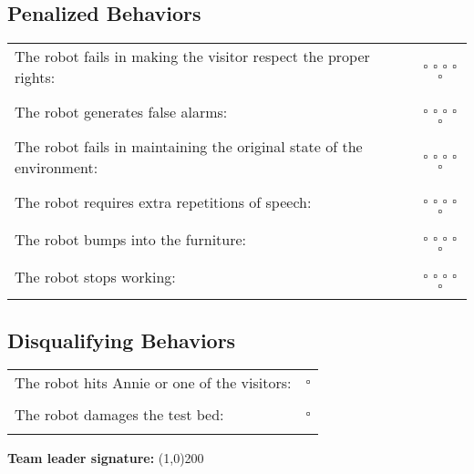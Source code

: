 \subsection*{Penalized Behaviors}
\begin{tabular}{ l c}
The robot fails in making the visitor respect the proper rights: & $\square$ $\square$ $\square$ $\square$ $\square$ \\ \\
The robot generates false alarms: & $\square$ $\square$ $\square$ $\square$ $\square$ \\ \\
The robot fails in maintaining the original state of the environment: & $\square$ $\square$ $\square$ $\square$ $\square$ \\ \\
The robot requires extra repetitions of speech: & $\square$ $\square$ $\square$ $\square$ $\square$ \\ \\
The robot bumps into the furniture: & $\square$ $\square$ $\square$ $\square$ $\square$ \\ \\
The robot stops working: & $\square$ $\square$ $\square$ $\square$ $\square$ \\ \\
\end{tabular}

\subsection*{Disqualifying Behaviors}
\begin{tabular}{ l c}
The robot hits Annie or one of the visitors: & $\square$ \\ \\
The robot damages the test bed: & $\square$ \\ \\
\end{tabular}

\vspace{0.6cm}
\begin{large}
\textbf{Team leader signature:}
\line(1,0){200}
\end{large}